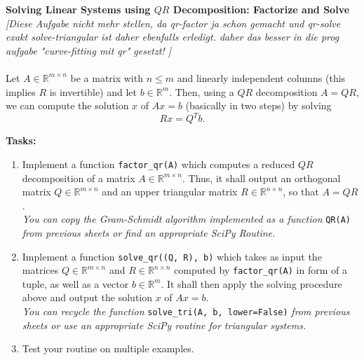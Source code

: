 \textbf{Solving Linear Systems using $QR$ Decomposition: Factorize and Solve}\\
\textit{\color{red}[Diese Aufgabe nicht mehr stellen, da qr-factor ja schon gemacht und qr-solve exakt solve-triangular ist daher ebenfalls erledigt. daher das besser in die prog aufgabe "curve-fitting mit qr" gesetzt!  ]}\\~\\
Let $A \in \mathbb{R}^{m\times n}$ be a matrix with $n \leq m$ and linearly independent columns (this implies $R$ is invertible) and let $b \in \mathbb{R}^m$. Then, using a $QR$ decomposition $A=QR$, we can compute the solution $x$ of $Ax=b$ (basically in two steps) by solving
$$Rx = Q^Tb.$$

\textbf{Tasks:}
\begin{enumerate}
	\item Implement a function \verb|factor_qr(A)| which computes a reduced $QR$ decomposition of a matrix $A \in \mathbb{R}^{m\times n}$. Thus, it shall output an orthogonal matrix $Q \in \mathbb{R}^{m\times n}$ and an upper triangular matrix $R \in\mathbb{R}^{n\times n}$, so that $A = QR$.\\ 
	\textit{You can copy the Gram-Schmidt algorithm implemented as a function} \verb|QR(A)| \textit{from previous sheets or find an appropriate SciPy Routine.}
	\item Implement a function \verb|solve_qr((Q, R), b)| which takes as input the matrices $Q \in \mathbb{R}^{m\times n}$ and $R \in\mathbb{R}^{n\times n}$ computed by \verb|factor_qr(A)| in form of a tuple, as well as a vector $b \in \mathbb{R}^{m}$. It shall then apply the solving procedure above and output the solution $x$ of $Ax=b$.\\ 
	\textit{You can recycle the function} \verb|solve_tri(A, b, lower=False)| \textit{from previous sheets or use an appropriate SciPy routine for triangular systems.}
	\item Test your routine on multiple examples.
\end{enumerate}

